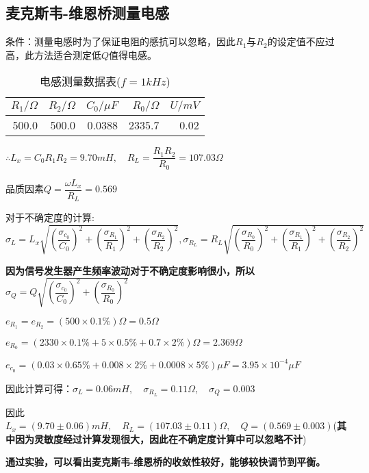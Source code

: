\documentclass[UTF8]{ctexart}
\begin{document}
	\subsection{麦克斯韦-维恩桥测量电感}
	条件：测量电感时为了保证电阻的感抗可以忽略，因此$R_{1}$与$R_{2}$的设定值不应过高，此方法适合测定低$Q$值得电感。
	\begin{table}[H]
		\centering
		\caption{电感测量数据表($f=1kHz$)}
		\label{电感测量数据表}
		\begin{tabular}{|r|r|r|r|r|}
			\toprule[0.5mm]
			$R_{1}/\Omega$&$R_{2}/\Omega$&$C_{0}/\mu F$&$R_{0}/\Omega$&$U/mV$\\
			\midrule
			500.0&500.0&0.0388&2335.7&0.02\\
			\bottomrule[0.5mm]
		\end{tabular}
	\end{table}
	$\therefore L_{x}=C_{0}R_{1}R_{2}=9.70mH,\quad R_{L}=\dfrac{R_{1}R_{2}}{R_{0}}=107.03\Omega$
	\par 品质因素$Q=\dfrac{\omega L_{x}}{R_{L}}=0.569$
	\par 对于不确定度的计算:$\sigma_{L}=L_{x}\sqrt{(\dfrac{\sigma_{c_{0}}}{C_{0}})^{2}+(\dfrac{\sigma_{R_{1}}}{R_{1}})^{2}+(\dfrac{\sigma_{R_{2}}}{R_{2}})^{2}},\sigma_{R_{L}}=R_{L}\sqrt{(\dfrac{\sigma_{R_{0}}}{R_{0}})^{2}+(\dfrac{\sigma_{R_{1}}}{R_{1}})^{2}+(\dfrac{\sigma_{R_{2}}}{R_{2}})^{2}}$
	\par \textbf{因为信号发生器产生频率波动对于不确定度影响很小，所以}$\sigma_{Q}=Q\sqrt{(\dfrac{\sigma_{c_{0}}}{C_{0}})^{2}+(\dfrac{\sigma_{R_{0}}}{R_{0}})^{2}}$
	\par $e_{R_{1}}=e_{R_{2}}=(500\times0.1\%)\Omega=0.5\Omega$
	\par $e_{R_{0}}=(2330\times0.1\%+5\times0.5\%+0.7\times2\%)\Omega=2.369\Omega$
	\par $e_{c_{0}}=(0.03\times 0.65\%+0.008\times2\%+0.0008\times5\%)\mu F=3.95\times 10^{-4}\mu F$
	\par 因此计算可得：$\sigma_{L}=0.06mH,\quad\sigma_{R_{L}}=0.11\Omega,\quad\sigma_{Q}=0.003$
	\par 因此$L_{x}=(9.70\pm 0.06)mH,\quad R_{L}=(107.03\pm 0.11)\Omega,\quad Q=(0.569\pm 0.003)$(\textbf{其中因为灵敏度经过计算发现很大，因此在不确定度计算中可以忽略不计})
	\par \textbf{通过实验，可以看出麦克斯韦-维恩桥的收敛性较好，能够较快调节到平衡。}
\end{document}
